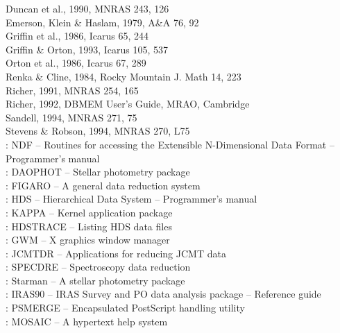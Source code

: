\documentclass[11pt,noabs]{starlink}
\begin{document}
Duncan et al., 1990, MNRAS 243, 126\\
Emerson, Klein \& Haslam, 1979, A\&A 76, 92\\
Griffin et al., 1986, Icarus  65, 244\\
Griffin \& Orton, 1993, Icarus 105, 537\\
Orton et al., 1986, Icarus 67, 289\\
Renka \& Cline, 1984, Rocky Mountain J. Math 14, 223\\
Richer, 1991, MNRAS 254, 165\\
Richer, 1992, DBMEM User's Guide, MRAO, Cambridge\\
Sandell, 1994, MNRAS 271, 75\\
Stevens \& Robson, 1994, MNRAS 270, L75\\

: NDF -- Routines for
   accessing the Extensible N-Dimensional Data Format -- Programmer's
   manual\\
: DAOPHOT -- Stellar
   photometry package\\
: FIGARO -- A general data
   reduction system\\
: HDS -- Hierarchical Data
   System -- Programmer's manual\\
: KAPPA -- Kernel application
   package\\
: HDSTRACE -- Listing HDS
   data files\\
: GWM -- X graphics window
   manager\\
: JCMTDR -- Applications
   for reducing JCMT data\\
: SPECDRE -- Spectroscopy
   data reduction\\
: Starman -- A stellar
   photometry package\\
: IRAS90 -- IRAS Survey and
   PO data analysis package -- Reference guide\\
: PSMERGE -- Encapsulated
   PostScript handling utility\\
: MOSAIC -- A hypertext
   help system\\
\end{document}
